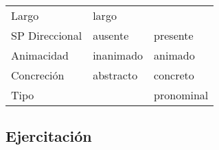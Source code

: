 \documentclass[12pt,spanish,a4paper,]{article}
\begin{document}
\begin{longtable}[]{@{}lll@{}}
\begin{minipage}[t]{0.22\columnwidth}
Largo\strut
\end{minipage} & \begin{minipage}[t]{0.39\columnwidth}\raggedright
largo\strut
\end{minipage} & \begin{minipage}[t]{0.25\columnwidth}\raggedright
\strut
\end{minipage}\tabularnewline
\begin{minipage}[t]{0.22\columnwidth}\raggedright
SP Direccional\strut
\end{minipage} & \begin{minipage}[t]{0.39\columnwidth}\raggedright
ausente\strut
\end{minipage} & \begin{minipage}[t]{0.25\columnwidth}\raggedright
presente\strut
\end{minipage}\tabularnewline
\begin{minipage}[t]{0.22\columnwidth}\raggedright
Animacidad\strut
\end{minipage} & \begin{minipage}[t]{0.39\columnwidth}\raggedright
inanimado\strut
\end{minipage} & \begin{minipage}[t]{0.25\columnwidth}\raggedright
animado\strut
\end{minipage}\tabularnewline
\begin{minipage}[t]{0.22\columnwidth}\raggedright
Concreción\strut
\end{minipage} & \begin{minipage}[t]{0.39\columnwidth}\raggedright
abstracto\strut
\end{minipage} & \begin{minipage}[t]{0.25\columnwidth}\raggedright
concreto\strut
\end{minipage}\tabularnewline
\begin{minipage}[t]{0.22\columnwidth}\raggedright
Tipo\strut
\end{minipage} & \begin{minipage}[t]{0.39\columnwidth}\raggedright
\strut
\end{minipage} & \begin{minipage}[t]{0.25\columnwidth}\raggedright
pronominal\strut
\end{minipage}\tabularnewline
\bottomrule
\end{longtable}

\hypertarget{ejercitacion-3}{%
\subsection{Ejercitación}\label{ejercitacion-3}}
\end{document}
